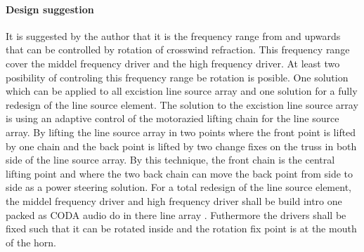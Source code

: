 \paragraph{Design suggestion} 
It is suggested by the author that it is the frequency range from  and upwards that can be controlled by rotation of crosswind refraction. This frequency range cover the middel frequency driver and the high frequency driver. At least two posibility of controling this frequency range be rotation is posible. One solution which can be applied to all excistion line source array and one solution for a fully redesign of the line source element. The solution to the excistion line source array is using an adaptive control of the motorazied lifting chain for the line source array. By lifting the line source array in two points where the front point is lifted by one chain and the back point is lifted by two change fixes on the truss in both side of the line source array. By this technique, the front chain is the central lifting point and where the two back chain can move the back point from side to side as a power steering solution. For a total redesign of the line source element, the middel frequency driver and high frequency driver shall be build intro one packed as CODA audio do in there line array \citep{coda_ddp}. Futhermore the drivers shall be fixed such that it can be rotated inside and the rotation fix point is at the mouth of the horn.   




